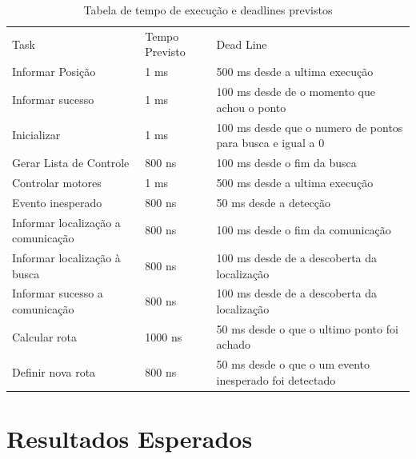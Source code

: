 \documentclass{abnt}
\begin{document}
\begin{table}
 \caption{ Tabela de tempo de execução e deadlines previstos \label{tabela}}
    \begin{footnotesize}
    \begin{tabular}{|lll|}
    \hline
    Task                                 & Tempo Previsto & Dead Line                                                  \\
    Informar Posição                     & 1 ms           & 500 ms desde a ultima execução                             \\
    Informar sucesso                     & 1 ms           & 100 ms desde de o momento que achou o ponto                \\
    Inicializar                          & 1 ms           & 100 ms desde que o numero de pontos para busca e igual a 0 \\
    Gerar Lista de Controle              & 800 ns         & 100 ms desde o fim da busca                                \\
    Controlar motores                    & 1 ms           & 500 ms desde a ultima execução                             \\
    Evento inesperado                    & 800 ns         & 50 ms desde a detecção                                     \\
     Informar localização a comunicação  & 800 ns         & 100 ms desde o fim da comunicação                          \\
    Informar localização à busca         & 800 ns         & 100 ms desde de a descoberta da localização                \\
    Informar sucesso  a comunicação      & 800 ns         & 100 ms desde de a descoberta da localização                \\
    Calcular rota                        & 1000 ns        & 50 ms desde o que o ultimo ponto foi achado                \\
    Definir nova rota                    & 800 ns         & 50 ms desde o que o um evento inesperado foi detectado     \\ \hline
    \end{tabular}
\end{footnotesize}
\end{table}



\chapter{Resultados Esperados} \label{result}        
\end{document}
